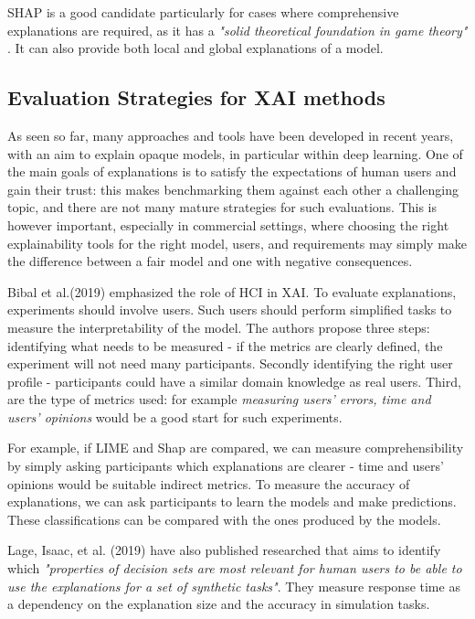 \documentclass[proposal]{softeng}
\begin{document}
SHAP is a good candidate particularly for cases where comprehensive explanations are required, as it has a \textit{"solid theoretical foundation in game theory" }\cite{molnar2019}. It can also provide both local and global explanations of a model.

\subsection{Evaluation Strategies for XAI methods}
As seen so far, many approaches and tools have been developed in recent years, with an aim to explain opaque models, in particular within deep learning. One of the main goals of explanations is to satisfy the expectations of human users and gain their trust: this makes benchmarking them against each other a challenging topic, and there are not many mature strategies for such evaluations. This is however important, especially in commercial settings, where choosing the right explainability tools for the right model, users, and requirements may simply make the difference between a fair model and one with negative consequences.


Bibal et al.(2019) \cite{bibal2019user} emphasized the role of HCI in XAI. To evaluate explanations, experiments should involve users. Such users should perform simplified tasks to measure the interpretability of the model. The authors propose three steps: identifying what needs to be measured - if the metrics are clearly defined, the experiment will not need many participants. Secondly identifying the right user profile - participants could have a similar domain knowledge as real users. Third, are the type of metrics used: for example \textit{measuring users' errors, time and users' opinions} would be a good start for such experiments.

For example, if LIME and Shap are compared, we can measure comprehensibility by simply asking participants which explanations are clearer - time and users' opinions would be suitable indirect metrics. To measure the accuracy of explanations, we can ask participants to learn the models and make predictions. These classifications can be compared with the ones produced by the models.

Lage, Isaac, et al. (2019) \cite{LageIsaac2019AEot} have also published researched that aims to identify which \textit{"properties of decision sets are most relevant for human users to be able to use the explanations for a set of synthetic tasks"}. They measure response time as a dependency on the explanation size and the accuracy in simulation tasks.
\end{document}
